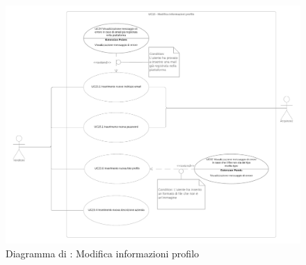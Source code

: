 \begin{figure}[H]
    \centering
    \includegraphics[width=\textwidth]{Immagini/DiagrammiUC/UC15ModificaInformazioniProfilo}
    \caption{Diagramma di \actualUC: Modifica informazioni profilo} 
    \label{fig:VisualizzazioneProdottiNelCarrello}
\end{figure}

